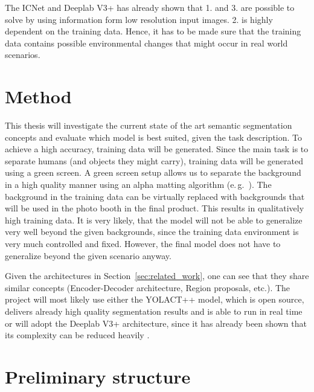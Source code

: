 \documentclass[11pt,
  paper=a4, 
  bibliography=totocnumbered,
	captions=tableheading,
	BCOR=10mm
]{scrreprt}
\theoremstyle{definition}
\newcommand{\eg}{e.\,g.~}
\begin{document}
The ICNet and Deeplab V3+ has already shown that 1. and 3. are possible to solve by using information form low resolution input images.
2. is highly dependent on the training data. 
Hence, it has to be made sure that the training data contains possible environmental changes that might occur in real world scenarios.

\chapter{Method}
\label{sec:Method}

This thesis will investigate the current state of the art semantic segmentation concepts and evaluate which model is best suited, given the task description.
To achieve a high accuracy, training data will be generated.
Since the main task is to separate humans (and objects they might carry), training data will be generated using a green screen.
A green screen setup allows us to separate the background in a high quality manner using an alpha matting algorithm (\eg \cite{Gastal2010}).
The background in the training data can be virtually replaced with backgrounds that will be used in the photo booth in the final product.
This results in qualitatively high training data.
It is very likely, that the model will not be able to generalize very well beyond the given backgrounds, since the training data environment is very much controlled and fixed.
However, the final model does not have to generalize beyond the given scenario anyway. 

Given the architectures in Section~\ref{sec:related_work}, one can see that they share similar concepts (Encoder-Decoder architecture, Region proposals, etc.).
The project will most likely use either the YOLACT++ model, which is open source, delivers already high quality segmentation results and is able to run in real time or will adopt the Deeplab V3+ architecture, since it has already been shown that its complexity can be reduced heavily \cite{Bazarevsky2018}.

\chapter{Preliminary structure}
\end{document}
